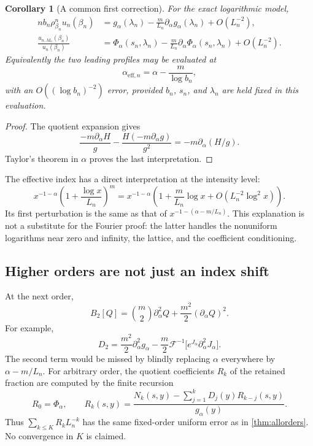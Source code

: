 \documentclass[11pt,a4paper]{article}
\numberwithin{equation}{section}
\newtheorem{corollary}[theorem]{Corollary}
\theoremstyle{definition}\newtheorem{definition}[theorem]{Definition}
\theoremstyle{remark}\newtheorem{remark}[theorem]{Remark}
\theoremstyle{definition}
\newcommand{\F}{\mathcal F^{-1}}
\begin{document}
\begin{corollary}[A common first correction]\label{cor:effective}
For the exact logarithmic model,
\begin{align}
 n b_n\rho_{\beta_n}^{n}u_n(\beta_n)
 &=g_\alpha(\lambda_n)-\frac m{L_n}\partial_\alpha g_\alpha(\lambda_n)
   +O(L_n^{-2}),\label{eq:firstfull}\\
 \frac{u_{n,M_n}(\beta_n)}{u_n(\beta_n)}
 &=\Phi_\alpha(s_n,\lambda_n)
   -\frac m{L_n}\partial_\alpha\Phi_\alpha(s_n,\lambda_n)
   +O(L_n^{-2}).\label{eq:firstPhi}
\end{align}
Equivalently the two leading profiles may be evaluated at
\begin{equation}\label{eq:effectivealpha}
 \alpha_{\mathrm{eff},n}=\alpha-\frac m{\log b_n},
\end{equation}
with an $O((\log b_n)^{-2})$ error, provided $b_n$, $s_n$, and $\lambda_n$
are held fixed in this evaluation.
\end{corollary}
\begin{proof}
The quotient expansion gives
\[
 \frac{-m\partial_\alpha H}{g}
 -\frac{H(-m\partial_\alpha g)}{g^2}
 =-m\partial_\alpha(H/g).
\]
Taylor's theorem in $\alpha$ proves the last interpretation.
\end{proof}

The effective index has a direct interpretation at the intensity level:
\[
 x^{-1-\alpha}\left(1+\frac{\log x}{L_n}\right)^m
 =x^{-1-\alpha}\left(1+\frac m{L_n}\log x+O(L_n^{-2}\log^2x)\right).
\]
Its first perturbation is the same as that of
$x^{-1-(\alpha-m/L_n)}$. This explanation is not a substitute for the
Fourier proof: the latter handles the nonuniform logarithms near zero
and infinity, the lattice, and the coefficient conditioning.

\subsection{Higher orders are not just an index shift}
At the next order,
\begin{equation}\label{eq:secondB}
 B_2[Q]=\binom m2\partial_\alpha^2Q
             +\frac{m^2}{2}(\partial_\alpha Q)^2.
\end{equation}
For example,
\[
 D_2=\frac{m^2}{2}\partial_\alpha^2g_\alpha
 -\frac m2\F\bigl[e^{J_\alpha}\partial_\alpha^2J_\alpha\bigr].
\]
The second term would be missed by blindly replacing $\alpha$ everywhere
by $\alpha-m/L_n$. For arbitrary order, the quotient coefficients $R_k$
of the retained fraction are computed by the finite recursion
\begin{equation}\label{eq:ratiorec}
 R_0=\Phi_\alpha,\qquad
 R_k(s,y)=\frac{N_k(s,y)-\sum_{j=1}^kD_j(y)R_{k-j}(s,y)}{g_\alpha(y)}.
\end{equation}
Thus $\sum_{k\le K}R_k L_n^{-k}$ has the same fixed-order uniform error as
in \cref{thm:allorders}. No convergence in $K$ is claimed.
\end{document}
